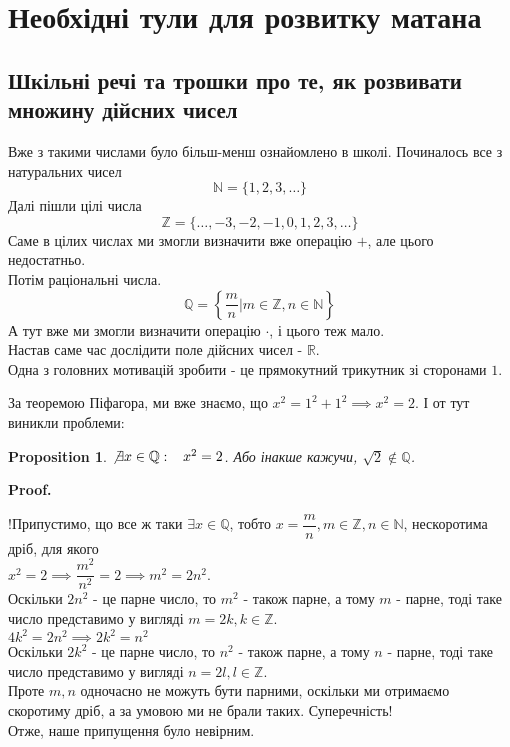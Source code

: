 \documentclass[a4paper, 14pt]{article}
\makeatletter
\def\qed{$\blacksquare$}
\theoremstyle{theoremdd}
\theoremstyle{theoremdd}
\theoremstyle{theoremdd}
\theoremstyle{theoremdd}
\theoremstyle{theoremdd}
\newtheorem{proposition}[theorem]{Proposition}
\theoremstyle{theoremdd}
\theoremstyle{theoremdd}
\theoremstyle{theoremdd}
\renewenvironment{proof}[1][Proof.\\]{\par
\pushQED{\hfill \qed}%
\normalfont \topsep6\p@\@plus6\p@\relax
\trivlist
\item\relax
{\bfseries
#1\@addpunct{.}}\hspace\labelsep\ignorespaces
}{%
\popQED\endtrivlist\@endpefalse
}
\makeatother
\begin{document}

\tableofcontents
\newpage

	\section*{Необхідні тули для розвитку матана}
	\subsection*{Шкільні речі та трошки про те, як розвивати множину дійсних чисел}
	Вже з такими числами було більш-менш ознайомлено в школі. Починалось все з натуральних чисел
	$$ \mathbb{N} = \{1,2,3,\dots\} $$
	Далі пішли цілі  числа \\
	$$ \mathbb{Z} = \{\dots,-3,-2,-1,0,1,2,3,\dots\} $$
	Саме в цілих числах ми змогли визначити вже операцію $+$, але цього недостатньо. \\
	Потім раціональні числа. \\
	$$ \mathbb{Q} = \left\{ \dfrac{m}{n} | m \in \mathbb{Z}, n \in \mathbb{N} \right\} $$
	А тут вже ми змогли визначити операцію $\cdot$, і цього теж мало.\\
	Настав саме час дослідити поле дійсних чисел - $\mathbb{R}$.\\
	Одна з головних мотивацій зробити - це прямокутний трикутник зі сторонами $1$.
	\begin{figure}[H]
	\centering
	\end{figure}
	За теоремою Піфагора, ми вже знаємо, що
	$x^2 = 1^2 + 1^2 \implies x^2 = 2$. І от тут виникли проблеми:
	\begin{proposition}
	$\not\exists  x \in \mathbb{Q}: \hspace{0.3cm} x^2 = 2$. Або інакше кажучи, $\sqrt{2} \not\in \mathbb{Q}$.
	\end{proposition}
	
	\begin{proof}
	!Припустимо, що все ж таки $\exists x \in \mathbb{Q}$, тобто $x= \dfrac{m}{n}, m \in \mathbb{Z}, n \in \mathbb{N}$, нескоротима дріб, для якого\\
	$x^2 = 2 \implies \dfrac{m^2}{n^2} = 2 \implies m^2 = 2n^2$.\\
	Оскільки $2n^2$ - це парне число, то $m^2$ - також парне, а тому $m$ - парне, тоді таке число представимо у вигляді $m = 2k, k \in \mathbb{Z}$.\\
	$4k^2 = 2n^2 \implies 2k^2 = n^2$\\
	Оскільки $2k^2$ - це парне число, то $n^2$ - також парне, а тому $n$ - парне, тоді таке число представимо у вигляді $n = 2l, l \in \mathbb{Z}$.\\
	Проте $m,n$ одночасно не можуть бути парними, оскільки ми отримаємо скоротиму дріб, а за умовою ми не брали таких. Суперечність!\\
	Отже, наше припущення було невірним.
	\end{proof}
	
\end{document}
